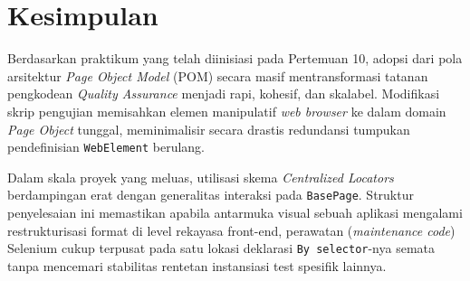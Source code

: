 \documentclass[a4paper,oneside,12pt]{report}
\begin{document}
\clearpage

\chapter{Kesimpulan}

Berdasarkan praktikum yang telah diinisiasi pada Pertemuan 10, adopsi dari pola arsitektur \textit{Page Object Model} (POM) secara masif mentransformasi tatanan pengkodean \textit{Quality Assurance} menjadi rapi, kohesif, dan skalabel. Modifikasi skrip pengujian memisahkan elemen manipulatif \textit{web browser} ke dalam domain \textit{Page Object} tunggal, meminimalisir secara drastis redundansi tumpukan pendefinisian \texttt{WebElement} berulang. 

Dalam skala proyek yang meluas, utilisasi skema \textit{Centralized Locators} berdampingan erat dengan generalitas interaksi pada \texttt{BasePage}. Struktur penyelesaian ini memastikan apabila antarmuka visual sebuah aplikasi mengalami restrukturisasi format di level rekayasa front-end, perawatan (\textit{maintenance code}) Selenium cukup terpusat pada satu lokasi deklarasi \texttt{By selector}-nya semata tanpa mencemari stabilitas rentetan instansiasi test spesifik lainnya.
\end{document}
